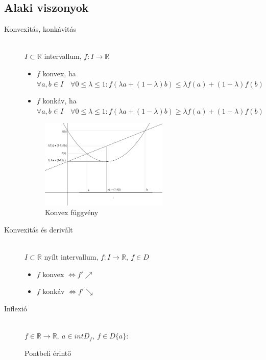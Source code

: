 \documentclass[margin=0px]{article}
\newcommand{\R}{\mathbb{R}}
\begin{document}
		\subsection{Alaki viszonyok}
		\begin{description}
			\item[Konvexitás, konkávitás] \hfill \\
			$ I \subset \R $ intervallum, $ f:I\rightarrow \R $
			\begin{itemize}
				\item $f$ konvex, ha \\
					$\forall a,b \in I \quad \forall 0\leq \lambda \leq 1: f(\lambda a+(1-\lambda)b) \leq  \lambda f(a) + (1-\lambda)f(b)$
				\item $f$ konkáv, ha \\
				$\forall a,b \in I \quad \forall 0\leq \lambda \leq 1: f(\lambda a+(1-\lambda)b) \geq  \lambda f(a) + (1-\lambda)f(b)$
			\end{itemize}
			\begin{figure}[H]
				\centering
				\includegraphics[width=0.6\textwidth]{img/konvex.png}
				\caption{Konvex függvény}
			\end{figure}
			\item[Konvexitás és derivált] \hfill \\
				$ I \subset \R $ nyílt intervallum, $f:I\rightarrow \R, \ f \in D $
				\begin{itemize}
					\item $f$ konvex $ \Leftrightarrow f' \nearrow $ 
					\item $f$ konkáv $ \Leftrightarrow f' \searrow $ 
				\end{itemize}
			\item[Inflexió] \hfill \\
				$ f \in \R \rightarrow \R, \ a \in intD_f, \ f \in D\{a\} $:
				\begin{description}
					\item[Pontbeli érintő] \hfill \\

\end{description}
\end{description}
\end{document}
